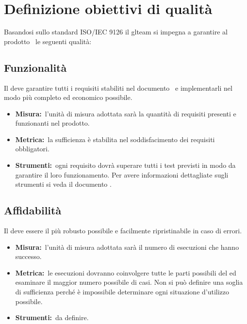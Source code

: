 
\section{Definizione obiettivi di qualità}
Basandosi sullo standard ISO/IEC 9126 il gl{team} si impegna a garantire al prodotto \PROGETTO\ le seguenti qualità:

\subsection{Funzionalità}
Il  deve garantire tutti i requisiti stabiliti nel documento \ARdoc\ e implementarli nel modo più completo ed economico possibile.
\begin{itemize}
\item \textbf{Misura:}\ l'unità di misura adottata sarà la quantità di requisiti presenti e funzionanti nel prodotto.
\item \textbf{Metrica:}\ la sufficienza è stabilita nel soddisfacimento dei requisiti obbligatori.
\item \textbf{Strumenti:}\ ogni requisito dovrà superare tutti i test previsti in modo da garantire il loro funzionamento. Per avere informazioni dettagliate sugli strumenti si veda il documento \NPdoc. 
\end{itemize}

\subsection{Affidabilità}
Il  deve essere il più robusto possibile e facilmente ripristinabile in caso di errori.
\begin{itemize}
\item \textbf{Misura:}\ l'unità di misura adottata sarà il numero di esecuzioni che hanno successo.
\item \textbf{Metrica:}\ le esecuzioni dovranno coinvolgere tutte le parti possibili del  ed esaminare il maggior numero possibile di casi. Non si può definire una soglia di sufficienza perché è impossibile determinare ogni situazione d'utilizzo possibile.
\item \textbf{Strumenti:}\ da definire.
\end{itemize}

